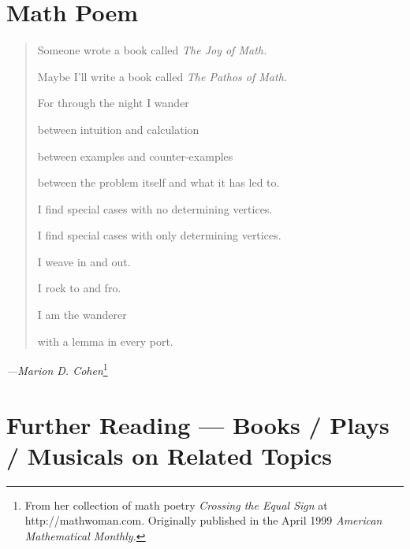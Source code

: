 \documentclass[12pt]{book}
\begin{document}
\chapter*{Math Poem}

\begin{verse}
  Someone wrote a book called \emph{The Joy of Math.}
  
  Maybe I'll write a book called \emph{The Pathos of Math.}

  For through the night I wander

  between intuition and calculation
  
  between examples and counter-examples
  
  between the problem itself and what it has led to.

  I find special cases with no determining vertices.

  I find special cases with only determining vertices.

  I weave in and out.

  I rock to and fro.

  I am the wanderer

  with a lemma in every port.
\end{verse}
\vspace{\baselineskip}
\emph{---Marion D. Cohen}\footnote
{From her collection of math poetry
\emph{Crossing the Equal Sign} 
at http://mathwoman.com.
Originally published in the April 1999 
\emph{American Mathematical Monthly.}}

\chapter*{Further Reading --- Books / Plays / Musicals on Related Topics}
\end{document}
